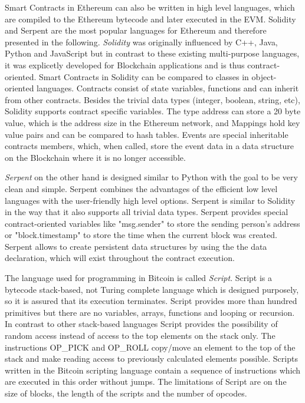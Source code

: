 \documentclass[conference]{IEEEtran}
\begin{document}
Smart Contracts in Ethereum can also be written in high level languages, which are compiled to the Ethereum bytecode and later executed in the EVM. Solidity and Serpent are the most popular languages for Ethereum and therefore presented in the following. \textit{Solidity} was originally influenced by C++, Java, Python and JavaScript but in contrast to these existing multi-purpose languages, it was explicetly developed for Blockchain applications and is thus contract-oriented. Smart Contracts in Solidity can be compared to classes in object-oriented languages. Contracts consist of state variables, functions and can inherit from other contracts. Besides the trivial data types (integer, boolean, string, etc), Solidity supports contract specific variables. The type address can store a 20 byte value, which is the address size in the Ethereum network, and Mappings hold key value pairs and can be compared to hash tables. Events are special inheritable contracts members, which, when called, store the event data in a data structure on the Blockchain where it is no longer accessible. \cite{Solidity2017} \cite{McAdams2017} \par 
\textit{Serpent} on the other hand is designed similar to Python with the goal to be very clean and simple. Serpent combines the advantages of the efficient low level languages with the user-friendly high level options. Serpent is similar to Solidity in the way that it also supports all trivial data types. Serpent provides special contract-oriented variables like "msg.sender" to store the sending person's address or "block.timestamp" to store the time when the current block was created. Serpent allows to create persistent data structures by using the the data declaration, which will exist throughout the contract execution. \cite{McAdams2017} \cite{Arnett2015} \par 
The language used for programming in Bitcoin is called \textit{Script}. Script is a bytecode stack-based, not Turing complete language which is designed purposely, so it is assured that its execution terminates. Script provides more than hundred primitives but there are no variables, arrays, functions and looping or recursion. In contrast to other stack-based languages Script provides the possibility of random access instead of access to the top elements on the stack only. The instructions OP\_PICK and OP\_ROLL copy/move an element to the top of the stack and make reading access to previously calculated elements possible. Scripts written in the Bitcoin scripting language contain a sequence of instructions which are executed in this order without jumps. The limitations of Script are on the size of blocks, the length of the scripts and the number of opcodes. \cite{McAdams2017} \par 
\end{document}
